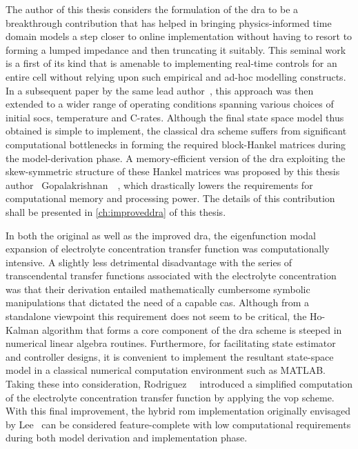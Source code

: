 The author  of this thesis  considers the formulation of  the \gls{dra} to  be a
breakthrough  contribution that  has  helped in  bringing physics-informed  time
domain models a step closer to online implementation without having to resort to
forming a lumped impedance and then truncating it suitably. This seminal work is
a first  of its  kind that  is amenable to  implementing real-time  controls for
an  entire  cell  without  relying  upon such  empirical  and  ad-hoc  modelling
constructs. In a  subsequent paper by the same  lead author~\cite{Lee2014}, this
approach was  then extended to  a wider  range of operating  conditions spanning
various  choices  of  initial  \glspl{soc}, temperature  and  C-rates.  Although
the  final  state  space  model  thus  obtained  is  simple  to  implement,  the
classical \gls{dra} scheme suffers from significant computational bottlenecks in
forming the  required block-Hankel  matrices during the  model-derivation phase.
A  memory-efficient  version  of  the \gls{dra}  exploiting  the  skew-symmetric
structure  of  these  Hankel  matrices   was  proposed  by  this  thesis  author
\ie~Gopalakrishnan~\etal{}~\cite{Gopalakrishnan2017},  which drastically  lowers
the requirements for  computational memory and processing power.  The details of
this contribution shall be presented in \cref{ch:improveddra} of this thesis.


In both the original as well  as the improved \gls{dra}, the eigenfunction modal
expansion  of electrolyte  concentration transfer  function was  computationally
intensive.  A  slightly  less  detrimental   disadvantage  with  the  series  of
transcendental transfer functions associated  with the electrolyte concentration
was   that  their   derivation  entailed   mathematically  cumbersome   symbolic
manipulations that  dictated the need  of a  capable \gls{cas}. Although  from a
standalone  viewpoint  this  requirement  does  not seem  to  be  critical,  the
\mbox{Ho-Kalman}  algorithm  that  forms  a  core  component  of  the  \gls{dra}
scheme  is  steeped  in  numerical linear  algebra  routines.  Furthermore,  for
facilitating  state  estimator  and  controller designs,  it  is  convenient  to
implement the resultant  state-space model in a  classical numerical computation
environment   such  as   \textsc{MATLAB}.  Taking   these  into   consideration,
Rodriguez~\etal{}~\cite{Rodriguez2017}  introduced a  simplified computation  of
the  electrolyte  concentration  transfer  function  by  applying  the  \gls{vop}
scheme.  With  this  final  improvement,  the  hybrid  \gls{rom}  implementation
originally envisaged by Lee~\etal{} can  be considered feature-complete with low
computational  requirements  during  both model  derivation  and  implementation
phase.


